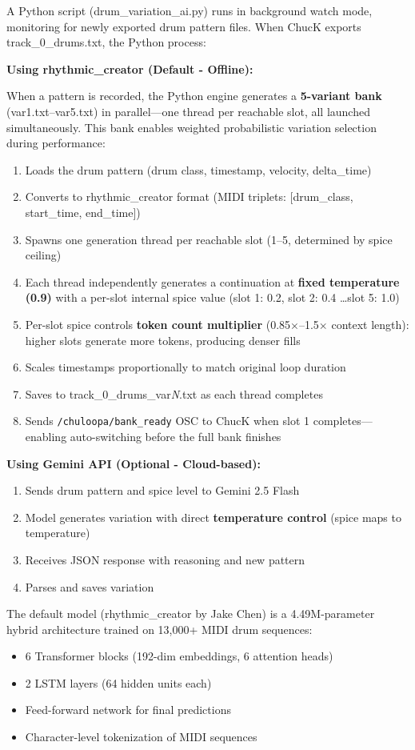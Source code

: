 \documentclass{aimc2026}
\begin{document}
A Python script (drum\_variation\_ai.py) runs in background watch mode, monitoring for newly exported drum pattern files. When ChucK exports track\_0\_drums.txt, the Python process:

\textbf{Using rhythmic\_creator (Default - Offline):}

When a pattern is recorded, the Python engine generates a \textbf{5-variant bank} (var1.txt--var5.txt) in parallel---one thread per reachable slot, all launched simultaneously. This bank enables weighted probabilistic variation selection during performance:

\begin{enumerate}
\item Loads the drum pattern (drum class, timestamp, velocity, delta\_time)
\item Converts to rhythmic\_creator format (MIDI triplets: [drum\_class, start\_time, end\_time])
\item Spawns one generation thread per reachable slot (1--5, determined by spice ceiling)
\item Each thread independently generates a continuation at \textbf{fixed temperature (0.9)} with a per-slot internal spice value (slot 1: 0.2, slot 2: 0.4 \ldots slot 5: 1.0)
\item Per-slot spice controls \textbf{token count multiplier} (0.85$\times$--1.5$\times$ context length): higher slots generate more tokens, producing denser fills
\item Scales timestamps proportionally to match original loop duration
\item Saves to track\_0\_drums\_var\textit{N}.txt as each thread completes
\item Sends \texttt{/chuloopa/bank\_ready} OSC to ChucK when slot 1 completes---enabling auto-switching before the full bank finishes
\end{enumerate}

\textbf{Using Gemini API (Optional - Cloud-based):}
\begin{enumerate}
\item Sends drum pattern and spice level to Gemini 2.5 Flash
\item Model generates variation with direct \textbf{temperature control} (spice maps to temperature)
\item Receives JSON response with reasoning and new pattern
\item Parses and saves variation
\end{enumerate}

The default model (rhythmic\_creator by Jake Chen) is a 4.49M-parameter hybrid architecture trained on 13,000+ MIDI drum sequences:
\begin{itemize}
\item 6 Transformer blocks (192-dim embeddings, 6 attention heads)
\item 2 LSTM layers (64 hidden units each)
\item Feed-forward network for final predictions
\item Character-level tokenization of MIDI sequences
\end{itemize}
\end{document}
